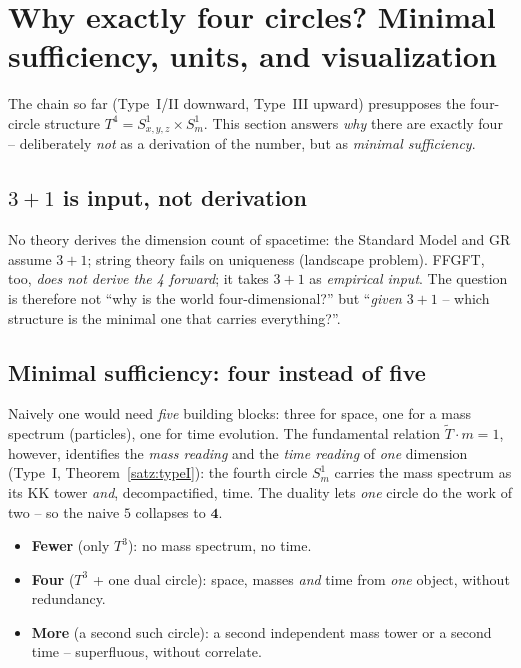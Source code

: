\section{Why exactly four circles? Minimal sufficiency, units, and visualization}\label{sec:warumvier}

The chain so far (Type~I/II downward, Type~III upward) presupposes the four-circle
structure $T^4 = S^1_{x,y,z}\times S^1_m$. This section answers \emph{why} there
are exactly four -- deliberately \emph{not} as a derivation of the number, but as
\emph{minimal sufficiency}.

\subsection{$3+1$ is input, not derivation}

No theory derives the dimension count of spacetime: the Standard Model and GR
assume $3+1$; string theory fails on uniqueness (landscape problem). FFGFT, too,
\emph{does not derive the 4 forward}; it takes $3+1$ as \emph{empirical input}.
The question is therefore not \enquote{why is the world four-dimensional?} but
\enquote{\emph{given} $3+1$ -- which structure is the minimal one that carries
everything?}.

\subsection{Minimal sufficiency: four instead of five}

\begin{important}
Naively one would need \emph{five} building blocks: three for space, one for a
mass spectrum (particles), one for time evolution. The fundamental relation
$\tilde T\cdot m = 1$, however, identifies the \emph{mass reading} and the
\emph{time reading} of \emph{one} dimension (Type~I, Theorem~\ref{satz:typeI}):
the fourth circle $S^1_m$ carries the mass spectrum as its KK tower \emph{and},
decompactified, time. The duality lets \emph{one} circle do the work of two -- so
the naive $5$ collapses to $\mathbf{4}$.
\end{important}

\begin{itemize}
  \item \textbf{Fewer} (only $T^3$): no mass spectrum, no time.
  \item \textbf{Four} ($T^3$ + one dual circle): space, masses \emph{and} time
  from \emph{one} object, without redundancy.
  \item \textbf{More} (a second such circle): a second independent mass tower or a
  second time -- superfluous, without correlate.
\end{itemize}

